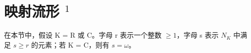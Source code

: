 \section{\texorpdfstring{映射流形 \(^{1}\)}{映射流形 ¹}}

在本节中，假设 K = R 或 C。字母 r 表示一个整数 \(\geqslant 1\)，字母 s 表示 \(N_{K}\) 中满足 \(s \geqslant r\) 的元素；若 K = C，则有 \(s = \omega\)。

